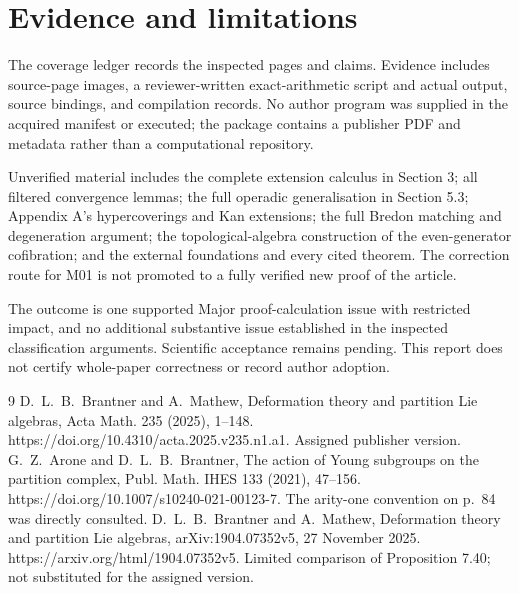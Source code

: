 \documentclass[10pt]{article}
\begin{document}
\section*{Evidence and limitations}
The coverage ledger records the inspected pages and claims. Evidence includes source-page images, a reviewer-written exact-arithmetic script and actual output, source bindings, and compilation records. No author program was supplied in the acquired manifest or executed; the package contains a publisher PDF and metadata rather than a computational repository.\par
Unverified material includes the complete extension calculus in Section 3; all filtered convergence lemmas; the full operadic generalisation in Section 5.3; Appendix A’s hypercoverings and Kan extensions; the full Bredon matching and degeneration argument; the topological-algebra construction of the even-generator cofibration; and the external foundations and every cited theorem. The correction route for M01 is not promoted to a fully verified new proof of the article.\par
The outcome is one supported Major proof-calculation issue with restricted impact, and no additional substantive issue established in the inspected classification arguments. Scientific acceptance remains pending. This report does not certify whole-paper correctness or record author adoption.\par
9 D. L. B. Brantner and A. Mathew, Deformation theory and partition Lie algebras, Acta Math. 235 (2025), 1–148. https://doi.org/10.4310/acta.2025.v235.n1.a1. Assigned publisher version. G. Z. Arone and D. L. B. Brantner, The action of Young subgroups on the partition complex, Publ. Math. IHES 133 (2021), 47–156. https://doi.org/10.1007/s10240-021-00123-7. The arity-one convention on p. 84 was directly consulted. D. L. B. Brantner and A. Mathew, Deformation theory and partition Lie algebras, arXiv:1904.07352v5, 27 November 2025. https://arxiv.org/html/1904.07352v5. Limited comparison of Proposition 7.40; not substituted for the assigned version.\par
\end{document}
